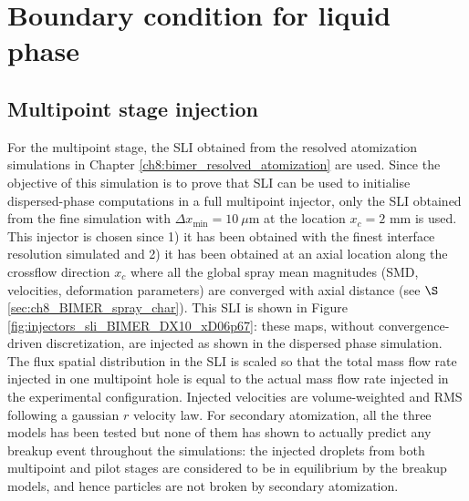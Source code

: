

\section{Boundary condition for liquid phase}
\label{sec:ch9_BIMER_BCs_for_liquid_phase}


\subsection{Multipoint stage injection}

For the multipoint stage, the SLI obtained from the resolved atomization simulations in Chapter \ref{ch8:bimer_resolved_atomization} are used. Since the objective of this simulation is to prove that SLI can be used to initialise dispersed-phase computations in a full multipoint injector, only the SLI obtained from the fine simulation with $\Delta x_\mathrm{min} = 10~\mu$m at the location $x_c = 2$ mm is used. This injector is chosen since 1) it has been obtained with the finest interface resolution simulated and 2) it has been obtained at an axial location along the crossflow direction $x_c$ where all the global spray mean magnitudes (SMD, velocities, deformation parameters) are converged with axial distance (see $\S$\ref{sec:ch8_BIMER_spray_char}). This SLI is shown in Figure \ref{fig:injectors_sli_BIMER_DX10_xD06p67}: these maps, without convergence-driven discretization, are injected as shown in the dispersed phase simulation. The flux spatial distribution in the SLI is scaled so that the total mass flow rate injected in one multipoint hole is equal to the actual mass flow rate injected in the experimental configuration. Injected velocities are volume-weighted and RMS following a gaussian $r$ velocity law. For secondary atomization, all the three models has been tested but none of them has shown to actually predict any breakup event throughout the simulations: the injected droplets from both multipoint and pilot stages are considered to be in equilibrium by the breakup models, and hence particles are not broken by secondary atomization. %

